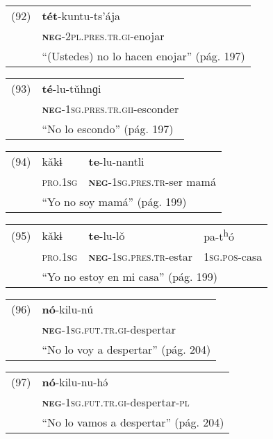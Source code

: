 {\setmainfont{Charis SIL} 

\begin{tabular}{ll}
(92) & \textbf{tét}-kuntu-ts’ája \\
& \textsc{\textbf{neg}-2pl.pres.tr.gi}-enojar \\
& ``(Ustedes) no lo hacen enojar'' (pág. 197)
\end{tabular} \vspace{0.3cm}

\begin{tabular}{ll}
(93) & \textbf{té}-lu-tǔhnɡi \\
& \textsc{\textbf{neg}-1sg.pres.tr.gii}-esconder \\
& ``No lo escondo'' (pág. 197)
\end{tabular} \vspace{0.3cm}

\begin{tabular}{lll}
(94) & kǎkɨ & \textbf{te}-lu-nantli \\
& \textsc{pro.1sg} & \textsc{\textbf{neg}-1sg.pres.tr}-ser mamá\\
& \multicolumn{2}{l}{``Yo no soy mamá'' (pág. 199)}
\end{tabular} \vspace{0.3cm}

\begin{tabular}{llll}
(95) & kǎkɨ & \textbf{te}-lu-lǒ & pa-t\textsuperscript{h}ó \\
& \textsc{pro.1sg} & \textsc{\textbf{neg}-1sg.pres.tr}-estar & \textsc{1sg.pos}-casa \\
& \multicolumn{3}{l}{``Yo no estoy en mi casa'' (pág. 199)}
\end{tabular} \vspace{0.3cm}

\begin{tabular}{ll}
(96) & \textbf{nó}-kilu-nú \\
& \textsc{\textbf{neg}-1sg.fut.tr.gi}-despertar \\
& ``No lo voy a despertar'' (pág. 204)
\end{tabular} \vspace{0.3cm}

\begin{tabular}{ll}
(97) & \textbf{nó}-kilu-nu-hə́ \\
& \textsc{\textbf{neg}-1sg.fut.tr.gi}-despertar-\textsc{pl} \\
& ``No lo vamos a despertar'' (pág. 204)
\end{tabular} \vspace{0.5cm}

}

